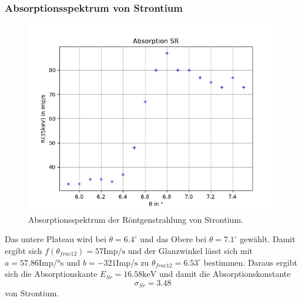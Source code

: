 \subsubsection*{Absorptionsspektrum von Strontium}
\begin{figure}[H]
  \centering
  \includegraphics{content/Sr.png}
  \caption{Absorptionsspektrum der Röntgenstrahlung von Strontium.}
  \label{fig:sr}
\end{figure}
Das untere Plateau wird bei $\theta=6.4^\circ$ und das Obere bei $\theta=7.1^\circ$ gewählt. Damit ergibt sich $f(\theta_{frac{1}{2}})=57 \textrm{Imp/s}$ und der Glanzwinkel lässt sich mit $a=57.86 \textrm{Imp/°s}$ und $b=-321 \textrm{Imp/s}$ zu $\theta_{frac{1}{2}}=6.53^\circ$ bestimmen. Daraus ergibt sich die Absorptionskante $E_{Sr}=16.58 \textrm{keV}$ und damit die Absorptionskonstante
\begin{equation*}
  \sigma_{Sr}=3.48
\end{equation*}
von Strontium.
  

